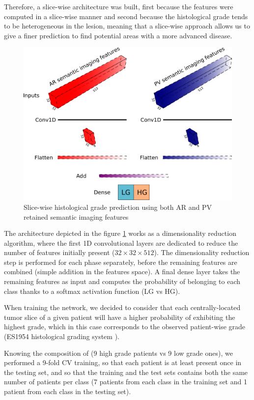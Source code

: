 Therefore, a slice-wise architecture was built, first because the
features were computed in a slice-wise manner and second because the
histological grade tends to be heterogeneous in the lesion, meaning that
a slice-wise approach allows us to give a finer prediction to find
potential areas with a more advanced disease.


\begin{figure}[th!]
\centering
\includegraphics[width=0.9\linewidth]{images/gradpredictionArchitecture}
\caption{Slice-wise histological grade prediction using both AR and PV retained semantic imaging features}
\label{fig:gradpredictionArchitecture}
\end{figure}



The architecture depicted in the figure \ref{fig:gradpredictionArchitecture} works as a dimensionality
reduction algorithm, where the first 1D convolutional layers are dedicated to
reduce the number of features initially present ($ 32\times32\times512 $). The
dimensionality reduction step is performed for each phase separately,
before the remaining features are combined (simple addition in the
features space).
A final dense layer takes the remaining features as input and computes
the probability of belonging to each class thanks to a softmax activation
function (LG vs HG).

When training the network, we decided to consider that each
centrally-located tumor slice of a given patient will have a higher
probability of exhibiting the highest grade, which in this case
corresponds to the observed patient-wise grade (ES1954 histological grading system \cite{EdmondsonHA1954}).

Knowing the composition of  (9 high grade patients vs 9 low
grade ones), we performed a 9-fold CV training, so that each patient is
at least present once in the testing set, and so that the training and
the test sets contains both the same number of patients per
class (7 patients from each class in the training set and 1 patient from
each class in the testing set).


